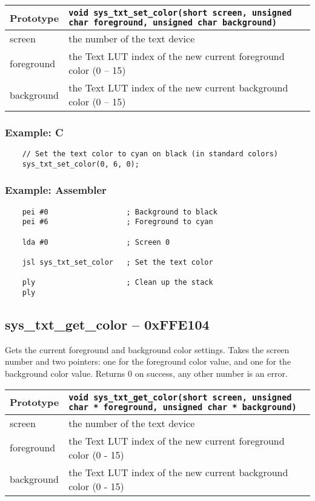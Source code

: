 \bigskip

\begin{tabular}{|l||l|} \hline
Prototype & \lstinline!void sys_txt_set_color(short screen, unsigned char foreground, unsigned char background)! \\ \hline
screen & the number of the text device \\ \hline
foreground & the Text LUT index of the new current foreground color (0 -- 15) \\ \hline
background & the Text LUT index of the new current background color (0 -- 15) \\ \hline
\end{tabular}

\subsubsection*{Example: C}
\begin{lstlisting}
    // Set the text color to cyan on black (in standard colors)
    sys_txt_set_color(0, 6, 0);
\end{lstlisting}

\subsubsection*{Example: Assembler}
\begin{verbatim}
    pei #0                  ; Background to black
    pei #6                  ; Foreground to cyan

    lda #0                  ; Screen 0

    jsl sys_txt_set_color   ; Set the text color

    ply                     ; Clean up the stack
    ply
\end{verbatim}


\subsection*{sys\_txt\_get\_color -- 0xFFE104}
Gets the current foreground and background color settings.
Takes the screen number and two pointers: one for the foreground color value, and one for the background color value.
Returns 0 on success, any other number is an error.

\bigskip

\begin{tabular}{|l||l|} \hline
Prototype & \lstinline!void sys_txt_get_color(short screen, unsigned char * foreground, unsigned char * background)! \\ \hline
screen & the number of the text device \\ \hline
foreground & the Text LUT index of the new current foreground color (0 - 15) \\ \hline
background & the Text LUT index of the new current background color (0 - 15) \\ \hline
\end{tabular}

